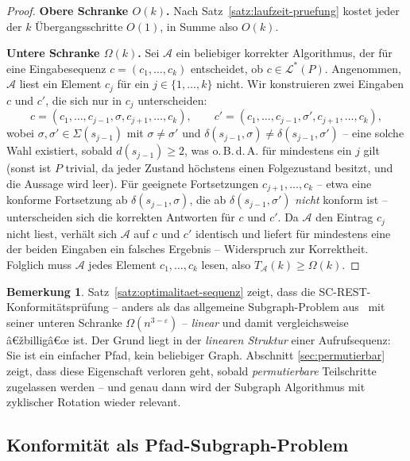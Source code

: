 ﻿\documentclass[a4paper,12pt]{article}
\theoremstyle{definition}
\newtheorem{bemerkung}{Bemerkung}
\begin{document}
\begin{proof}
	\textbf{Obere Schranke $O(k)$.} Nach Satz~\ref{satz:laufzeit-pruefung} kostet jeder
	der $k$ Übergangsschritte $O(1)$, in Summe also $O(k)$.

	\textbf{Untere Schranke $\Omega(k)$.} Sei $\mathcal{A}$ ein beliebiger korrekter
	Algorithmus, der für eine Eingabesequenz $c=(c_1,\ldots,c_k)$ entscheidet, ob
	$c \in \mathcal{L}^*(P)$. Angenommen, $\mathcal{A}$ liest ein Element $c_j$ für ein
	$j\in\{1,\ldots,k\}$ nicht. Wir konstruieren zwei Eingaben $c$ und $c'$, die sich nur
	in $c_j$ unterscheiden:
	\[
		c = (c_1,\ldots,c_{j-1}, \sigma, c_{j+1},\ldots,c_k), \qquad
		c' = (c_1,\ldots,c_{j-1}, \sigma', c_{j+1},\ldots,c_k),
	\]
	wobei $\sigma, \sigma' \in \Sigma(s_{j-1})$ mit $\sigma \neq \sigma'$ und
	$\delta(s_{j-1},\sigma) \neq \delta(s_{j-1},\sigma')$ -- eine solche Wahl existiert,
	sobald $d(s_{j-1}) \ge 2$, was o.\,B.\,d.\,A. für mindestens ein $j$ gilt (sonst ist
	$P$ trivial, da jeder Zustand höchstens einen Folgezustand besitzt, und die Aussage
	wird leer). Für geeignete Fortsetzungen $c_{j+1},\ldots,c_k$ -- etwa eine konforme
	Fortsetzung ab $\delta(s_{j-1},\sigma)$, die ab $\delta(s_{j-1},\sigma')$ \emph{nicht}
	konform ist -- unterscheiden sich die korrekten Antworten für $c$ und $c'$. Da
	$\mathcal{A}$ den Eintrag $c_j$ nicht liest, verhält sich $\mathcal{A}$ auf $c$ und
	$c'$ identisch und liefert für mindestens eine der beiden Eingaben ein falsches
	Ergebnis -- Widerspruch zur Korrektheit. Folglich muss $\mathcal{A}$ jedes Element
	$c_1,\ldots,c_k$ lesen, also $T_{\mathcal{A}}(k) \ge \Omega(k)$. \qedhere
\end{proof}

\begin{bemerkung}
	Satz~\ref{satz:optimalitaet-sequenz} zeigt, dass die SC-REST-Konformitätsprüfung --
	anders als das allgemeine Subgraph-Problem aus~\cite{epp2026subgraph} mit seiner
	unteren Schranke $\Omega(n^{3-\varepsilon})$ -- \emph{linear} und damit
	vergleichsweise â€žbilligâ€œ ist. Der Grund liegt in der \emph{linearen Struktur} einer
	Aufrufsequenz: Sie ist ein einfacher Pfad, kein beliebiger Graph. Abschnitt
	\ref{sec:permutierbar} zeigt, dass diese Eigenschaft verloren geht, sobald
	\emph{permutierbare} Teilschritte zugelassen werden -- und genau dann wird der
	Subgraph Algorithmus mit zyklischer Rotation wieder relevant.
\end{bemerkung}

\subsection{Konformität als Pfad-Subgraph-Problem}
\end{document}
